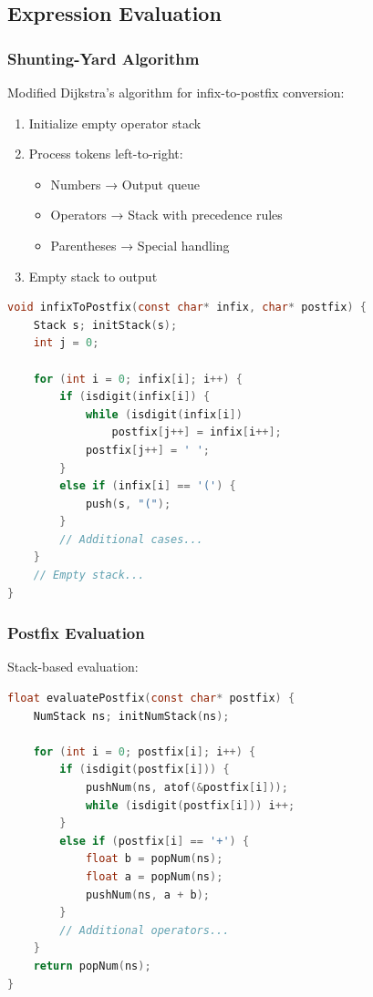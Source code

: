 \documentclass{article}
\begin{document}
\subsection{Expression Evaluation}

\subsubsection{Shunting-Yard Algorithm}
Modified Dijkstra's algorithm for infix-to-postfix conversion:

\begin{enumerate}
\item Initialize empty operator stack
\item Process tokens left-to-right:
  \begin{itemize}
  \item Numbers → Output queue
  \item Operators → Stack with precedence rules
  \item Parentheses → Special handling
  \end{itemize}
\item Empty stack to output
\end{enumerate}

\begin{lstlisting}[language=C,caption=Infix to Postfix]
void infixToPostfix(const char* infix, char* postfix) {
    Stack s; initStack(s);
    int j = 0;
    
    for (int i = 0; infix[i]; i++) {
        if (isdigit(infix[i]) {
            while (isdigit(infix[i]) 
                postfix[j++] = infix[i++];
            postfix[j++] = ' ';
        }
        else if (infix[i] == '(') {
            push(s, "(");
        }
        // Additional cases...
    }
    // Empty stack...
}
\end{lstlisting}

\subsubsection{Postfix Evaluation}
Stack-based evaluation:

\begin{lstlisting}[language=C,caption=Postfix Evaluation]
float evaluatePostfix(const char* postfix) {
    NumStack ns; initNumStack(ns);
    
    for (int i = 0; postfix[i]; i++) {
        if (isdigit(postfix[i])) {
            pushNum(ns, atof(&postfix[i]));
            while (isdigit(postfix[i])) i++;
        }
        else if (postfix[i] == '+') {
            float b = popNum(ns);
            float a = popNum(ns);
            pushNum(ns, a + b);
        }
        // Additional operators...
    }
    return popNum(ns);
}
\end{lstlisting}
\end{document}
